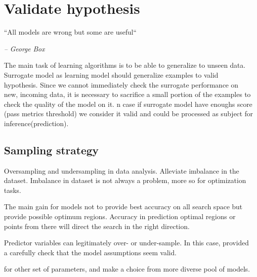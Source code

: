 \section{Validate hypothesis}
    \epigraph{``All models are wrong but some are useful``}{\textit{– George Box}}

    The main task of learning algorithms is to be able to generalize to unseen data. Surrogate model as learning model should generalize examples to valid hypothesis. 
    Since we cannot immediately check the surrogate performance on new, incoming data, it is necessary to sacrifice a small portion of the examples to check the quality of the model on it.
    n case if surrogate model have enoughs score (pass metrics threshold) we consider it valid and could be processed as subject for inference(prediction).

    \subsection{Sampling strategy}
    Oversampling and undersampling in data analysis. Alleviate imbalance in the dataset. 
    Imbalance in dataset is not always a problem, more so for optimization tasks. 

    The main gain for models not to provide best accuracy on all search space but provide possible optimum regions.
    Accuracy in prediction optimal regions or points from there will direct the search in the right direction.

    Predictor variables can legitimately over- or under-sample. 
    In this case, provided a carefully check that the model assumptions seem valid.


    for other set of parameters, and make a choice from more diverse pool of models.





